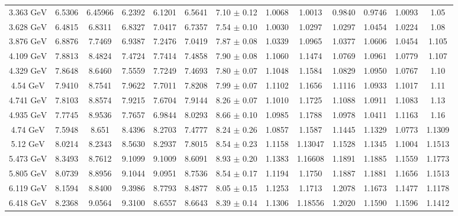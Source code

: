 \documentclass[11pt]{article}
\begin{document}
\begin{table}[htbp]
{\begin{tabular}{ccccccccccccc}
				3.363 ${\textrm{GeV}}$  & 6.5306 & 6.45966 & 6.2392 & 6.1201 & 6.5641 & 7.10 $\pm$ 0.12   & 1.0068 & 1.0013 & 0.9840 & 0.9746 & 1.0093 & 1.05  \\
				3.628 ${\textrm{GeV}}$  & 6.4815 & 6.8311 & 6.8327 & 7.0417 & 6.7357 & 7.54 $\pm$ 0.10  & 1.0030 & 1.0297 & 1.0297 & 1.0454 & 1.0224 & 1.08   \\
				3.876 ${\textrm{GeV}}$  & 6.8876 & 7.7469 & 6.9387 & 7.2476 & 7.0419 & 7.87 $\pm$ 0.08  & 1.0339 & 1.0965 & 1.0377 & 1.0606 & 1.0454 & 1.105  \\
				4.109 ${\textrm{GeV}}$  & 7.8813 & 8.4824 & 7.4724 & 7.7414 & 7.4858 & 7.90 $\pm$ 0.08  & 1.1060 & 1.1474 & 1.0769 & 1.0961 & 1.0779 & 1.107  \\
				4.329 ${\textrm{GeV}}$  & 7.8648 & 8.6460 & 7.5559 & 7.7249 & 7.4693 & 7.80 $\pm$ 0.07  & 1.1048 & 1.1584 & 1.0829 & 1.0950 & 1.0767 & 1.10  \\
				4.54 ${\textrm{GeV}}$  & 7.9410 & 8.7541 & 7.9622 & 7.7011 & 7.8208 & 7.99 $\pm$ 0.07  & 1.1102 & 1.1656 & 1.1116 & 1.0933 & 1.1017 & 1.11  \\
				4.741 ${\textrm{GeV}}$ & 7.8103 & 8.8574 & 7.9215 & 7.6704 & 7.9144 & 8.26 $\pm$ 0.07  & 1.1010 & 1.1725 & 1.1088 & 1.0911 & 1.1083 & 1.13  \\
				4.935 ${\textrm{GeV}}$ & 7.7745 & 8.9536 & 7.7657 & 6.9844 & 8.0293 & 8.66 $\pm$ 0.10  & 1.0985 & 1.1788 & 1.0978 & 1.0411 & 1.1163 & 1.16  \\
				\midrule
				4.74 ${\textrm{GeV}}$ & 7.5948 & 8.651 & 8.4396 & 8.2703 & 7.4777 & 8.24 $\pm$ 0.26  & 1.0857 & 1.1587 & 1.1445 & 1.1329 & 1.0773 & 1.1309  \\
				5.12 ${\textrm{GeV}}$ & 8.0214 & 8.2343 & 8.5630 & 8.2937 & 7.8015 & 8.54 $\pm$ 0.23  & 1.1158 & 1.13047 & 1.1528 & 1.1345 & 1.1004 & 1.1513  \\
				5.473 ${\textrm{GeV}}$ & 8.3493 & 8.7612 & 9.1099 & 9.1009 & 8.6091 & 8.93 $\pm$ 0.20  & 1.1383 & 1.16608 & 1.1891 & 1.1885 & 1.1559 & 1.1773  \\
				5.805 ${\textrm{GeV}}$ & 8.0739 & 8.8956 & 9.1044 & 9.0951 & 8.7536 & 8.54 $\pm$ 0.17  & 1.1194 & 1.1750 & 1.1887 & 1.1881 & 1.1656 & 1.1513  \\
				6.119 ${\textrm{GeV}}$ & 8.1594 & 8.8400 & 9.3986 & 8.7793 & 8.4877 & 8.05 $\pm$ 0.15  & 1.1253 & 1.1713 & 1.2078 & 1.1673 & 1.1477 & 1.1178  \\
				6.418 ${\textrm{GeV}}$ & 8.2368 & 9.0564 & 9.3100 & 8.6557 & 8.6643 & 8.39 $\pm$ 0.14  & 1.1306 & 1.18556 & 1.2020 & 1.1590 & 1.1596 & 1.1412  \\

\end{tabular}}
\end{table}
\end{document}
